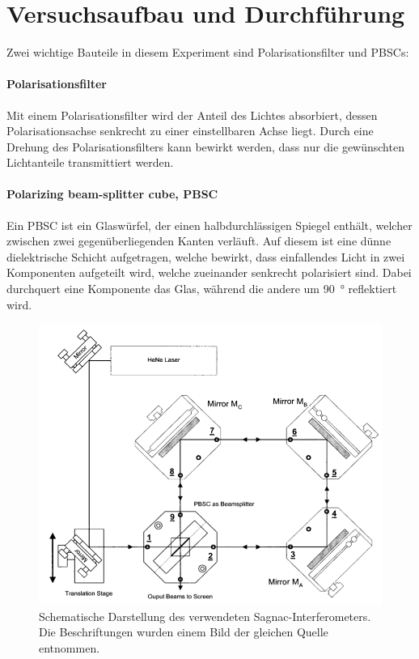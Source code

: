 

\section{Versuchsaufbau und Durchführung}
Zwei wichtige Bauteile in diesem Experiment sind Polarisationsfilter und PBSCs:

\paragraph{Polarisationsfilter}
Mit einem Polarisationsfilter wird der Anteil des Lichtes absorbiert, dessen Polarisationsachse senkrecht zu einer einstellbaren Achse liegt. Durch eine Drehung des Polarisationsfilters kann bewirkt werden, dass nur die gewünschten Lichtanteile transmittiert werden.

\paragraph{Polarizing beam-splitter cube, PBSC}
Ein PBSC ist ein Glaswürfel, der einen halbdurchlässigen Spiegel enthält, welcher zwischen zwei gegenüberliegenden Kanten verläuft. Auf diesem ist eine dünne dielektrische Schicht aufgetragen, welche bewirkt, dass einfallendes Licht in zwei Komponenten aufgeteilt wird, welche zueinander senkrecht polarisiert sind. Dabei durchquert eine Komponente das Glas, während die andere um \SI{90}{\degree} reflektiert wird.



\begin{figure}
\centering
\includegraphics[width=0.7\linewidth]{img/aufbau.png}
\caption{Schematische Darstellung des verwendeten Sagnac-Interferometers. Die Beschriftungen wurden einem Bild der gleichen Quelle entnommen. \cite{V64}}
\label{fig:aufbau}
\end{figure}

